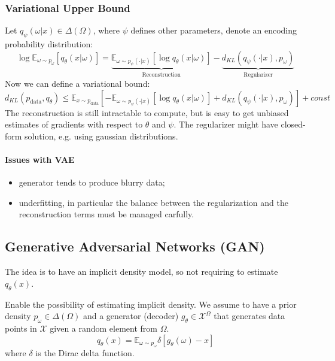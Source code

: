 \documentclass[a4paper,6pt,twocolumn,fleqn]{article}
\begin{document}
\subsubsection{Variational Upper Bound} %
Let \(q_\psi (\omega | x) \in \Delta(\Omega)\), where \(\psi\) defines other parameters, denote an encoding probability distribution:
\begin{equation}
    \log \mathbb{E}_{\omega \sim p_\omega} \left[ q_\theta (x | \omega) \right] = \underbrace{ \mathbb{E}_{\omega \sim p_\psi(\cdot | x)} \left[ \log q_\theta (x | \omega) \right] }_\text{Reconstruction} - \underbrace{ d_{KL}(q_\psi(\cdot | x), p_\omega) }_\text{Regularizer}
\end{equation}
Now we can define a variational bound:
\begin{equation}
    d_{KL} (p_\text{data}, q_\theta) \leq \mathbb{E}_{x \sim p_\text{data}} \left[
        - \mathbb{E}_{\omega \sim p_\psi(\cdot | x)} [\log q_\theta (x | \omega)] + d_{KL}(q_\psi(\cdot | x), p_\omega)
    \right] + const
\end{equation}
The reconstruction is still intractable to compute, but is easy to get unbiased estimates of gradients with respect to \(\theta\) and \(\psi\). The regularizer might have closed-form solution, e.g. using gaussian distributions.
\paragraph{Issues with VAE}
\begin{itemize}
    \item generator tends to produce blurry data;
    \item underfitting, in particular the balance between the regularization and the reconstruction terms must be managed carfully.
\end{itemize}
\subsection{Generative Adversarial Networks (GAN)} %
The idea is to have an implicit density model, so not requiring to estimate \(q_\theta(x)\).

Enable the possibility of estimating implicit density. We assume to have a prior density \(p_\omega \in \Delta(\Omega)\) and a generator (decoder) \(g_\theta \in \mathcal X^\Omega\) that generates data points in \(\mathcal X\) given a random element from \(\Omega\).
\begin{equation}
    q_\theta (x) = \mathbb E_{\omega \sim p_\omega} \delta [ g_\theta (\omega) - x ]
\end{equation}
where \(\delta\) is the Dirac delta function.
\end{document}
